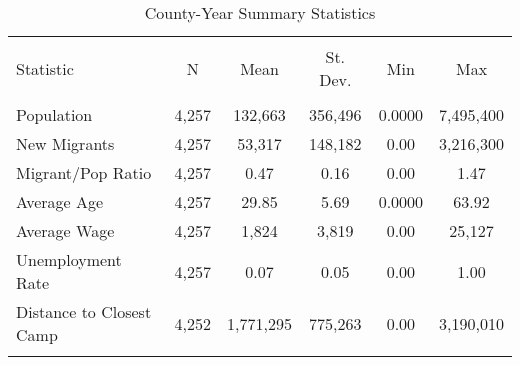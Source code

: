 
\begin{table}[!htbp] \centering 
  \caption{County-Year Summary Statistics} 
  \label{ctysumstats} 
\begin{tabular}{@{\extracolsep{5pt}}lccccc} 
\\[-1.8ex]\hline 
\hline \\[-1.8ex] 
Statistic & \multicolumn{1}{c}{N} & \multicolumn{1}{c}{Mean} & \multicolumn{1}{c}{St. Dev.} & \multicolumn{1}{c}{Min} & \multicolumn{1}{c}{Max} \\ 
\hline \\[-1.8ex] 
Population & 4,257 & 132,663 & 356,496 & 0.0000 & 7,495,400\\ 
New Migrants & 4,257 & 53,317 & 148,182 & 0.00 & 3,216,300\\ 
Migrant/Pop Ratio & 4,257 & 0.47 & 0.16 & 0.00 & 1.47 \\ 
Average Age & 4,257 & 29.85 & 5.69 & 0.0000 & 63.92 \\ 
Average Wage & 4,257 & 1,824 & 3,819 & 0.00 & 25,127\\ 
Unemployment Rate & 4,257 & 0.07 & 0.05 & 0.00 & 1.00 \\ 
Distance to Closest Camp & 4,252 & 1,771,295 & 775,263 & 0.00 & 3,190,010\\ 
\hline \\[-1.8ex] 
\end{tabular} 
\end{table} 

